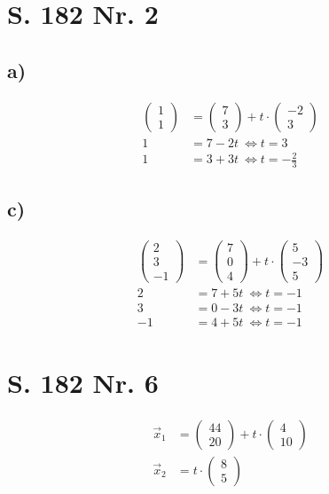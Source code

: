 \documentclass[12pt,a4paper]{report}
\begin{document}
	\section{S. 182 Nr. 2}
	\subsection{a)}
	\begin{align*}
		\begin{pmatrix}
			1 \\ 1
		\end{pmatrix} &= \begin{pmatrix}
			7 \\ 3
		\end{pmatrix} + t \cdot \begin{pmatrix}
			-2 \\ 3
		\end{pmatrix} \\
		1 &= 7 - 2t \ \Leftrightarrow t = 3 \\
		1 &= 3 + 3t\ \Leftrightarrow t = -\frac{2}{3}
	\end{align*}
	\subsection{c)}
	\begin{align*}
		\begin{pmatrix}
			2 \\ 3 \\ -1
		\end{pmatrix} &= \begin{pmatrix}
			7 \\ 0 \\ 4
		\end{pmatrix} + t \cdot \begin{pmatrix}
			5 \\ -3 \\ 5
		\end{pmatrix} \\
		2 &= 7 + 5t\ \Leftrightarrow t = -1 \\
		3 &= 0-3t\ \Leftrightarrow t = -1 \\
		-1 &= 4 + 5t\ \Leftrightarrow t = -1
	\end{align*}
	\section{S. 182 Nr. 6}
	\begin{align*}
		\overrightarrow x_1 &= \begin{pmatrix}
			44 \\ 20
		\end{pmatrix}
		+ t \cdot \begin{pmatrix}
			4 \\ 10
		\end{pmatrix} \\
		\overrightarrow x_ 2 &= t \cdot \begin{pmatrix}
			8 \\ 5
		\end{pmatrix}
	\end{align*}
\end{document}
